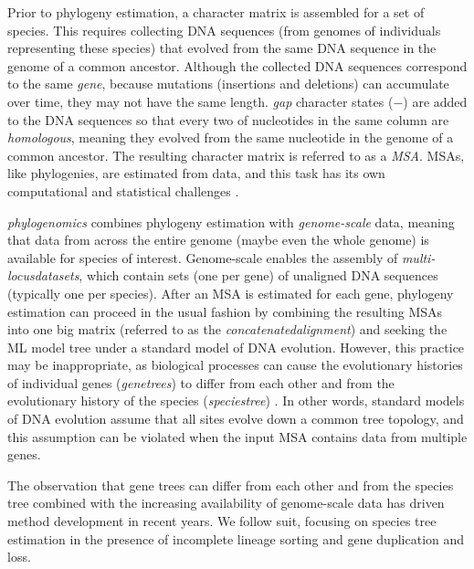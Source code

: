 Prior to phylogeny estimation, a character matrix is assembled for a set of species.
This requires collecting DNA sequences (from genomes of individuals representing these species) that evolved from the same DNA sequence in the genome of a common ancestor. Although the collected DNA sequences correspond to the same \textit{\gls{gene}}, because mutations (insertions and deletions) can accumulate over time, they may not have the same length.
\textit{\Gls{gap}} character states ($-$) are added to the DNA sequences so that every two of nucleotides in the same column are \textit{homologous}, meaning they evolved from the same nucleotide in the genome of a common ancestor.
The resulting character matrix is referred to as a \textit{\gls{MSA}}.
MSAs, like phylogenies, are estimated from data, and this task has its own computational and statistical challenges \cite{chatzou2015multiple, warnow2017computational}.

\textit{\Glspl{phylogenomic}} \cite{eisen1998phylogenomics} combines phylogeny estimation with \textit{\gls{genome-scale}} data, meaning that data from across the entire genome (maybe even the whole genome) is available for species of interest.
Genome-scale enables the assembly of \textit{\glspl{multi-locusdataset}}, which contain sets (one per gene) of unaligned DNA sequences (typically one per species).
After an MSA is estimated for each gene, phylogeny estimation can proceed in the usual fashion by combining the resulting MSAs into one big matrix (referred to as the \textit{\gls{concatenatedalignment}}) and seeking the ML model tree under a standard model of DNA evolution.
However, this practice may be inappropriate, as biological processes can cause the evolutionary histories of individual genes (\textit{\glspl{genetree}}) to differ from each other and from the evolutionary history of the species (\textit{\gls{speciestree}}) \cite{ohno1970evol, syvanen1985cross, maddison1997gene}.
In other words, standard models of DNA evolution assume that all sites evolve down a common tree topology, and this assumption can be violated when the input MSA contains data from multiple genes.

The observation that gene trees can differ from each other and from the species tree combined with the increasing availability of genome-scale data has driven method development in recent years.
We follow suit, focusing on species tree estimation in the presence of incomplete lineage sorting and gene duplication and loss.

